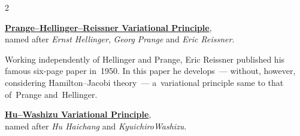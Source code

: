\begin{otherlanguage}{russian}


\label{para:mixedvariationalprinciples}

\begin{changemargin}{2\parindent}{\parindent}
\bgroup %
\setlength{\parindent}{\negparindent}
\small

\hspace{\parindent}\href{https://en.wikiversity.org/wiki/Introduction_to_Elasticity/Hellinger-Reissner_principle}{\textbf{Prange\hbox{--}Hellinger\hbox{--}Reissner Variational Principle}},\\
named after \emph{Ernst Hellinger}, \emph{Georg Prange} and \emph{Eric Reissner}.
\par

\nopagebreak\vspace{0.16em}
{\scriptsize \noindent Working independently of Hellinger and Prange, Eric Reissner published his famous six\hbox{-}page paper  in~1950. In this paper he develops~--- without, however, considering Hamilton\hbox{--}Jacobi theory~--- a~variational principle same to that of~Prange and~Hellinger.\par}

\nopagebreak\vspace{0.32em}
\href{https://en.wikiversity.org/wiki/Introduction_to_Elasticity/Hu-Washizu_principle}{\textbf{Hu\hbox{--}Washizu Variational Principle}},\\
named after \emph{Hu Haichang} and \emph{Kyuichiro\;Washizu}.
\par
\egroup
\nopagebreak\vspace{0.1em}
\end{changemargin}


\end{otherlanguage}
